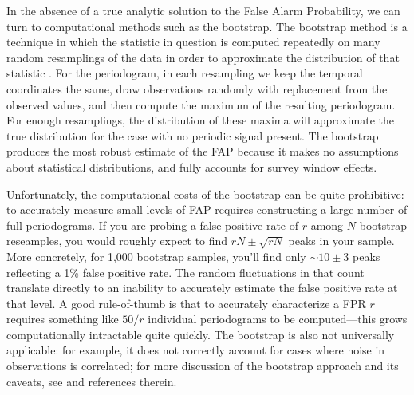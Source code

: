 \documentclass[preprint]{aastex}
\begin{document}
In the absence of a true analytic solution to the False Alarm Probability, we
can turn to computational methods such as the bootstrap.
The bootstrap method is a technique in which the statistic in question is
computed repeatedly on many random resamplings of the data in order to
approximate the distribution of that statistic
\citep[see][for a useful general discussion of this technique]{ICVG2014}.
For the periodogram, in each resampling we keep the temporal coordinates
the same, draw observations randomly with replacement from the observed
values, and then compute the maximum of the resulting periodogram.
For enough resamplings, the distribution of these maxima will approximate
the true distribution for the case with no periodic signal present.
The bootstrap produces the most robust estimate of the FAP because it makes
no assumptions about statistical distributions, and fully accounts for survey
window effects.

Unfortunately, the computational costs of the bootstrap can be quite
prohibitive: to accurately measure small levels of FAP requires constructing
a large number of full periodograms.
If you are probing a false positive rate of $r$ among $N$ bootstrap reseamples,
you would roughly expect to find $rN \pm \sqrt{rN}$ peaks in your sample.
More concretely, for 1,000 bootstrap samples, you'll find only $\sim 10\pm 3$
peaks reflecting a 1\% false positive rate.
The random fluctuations in that count translate directly to an inability to
accurately estimate the false positive rate at that level.
A good rule-of-thumb is that to accurately characterize a FPR $r$ requires
something like $50 / r$ individual periodograms to be computed---this grows
computationally intractable quite quickly.
The bootstrap is also not universally applicable: for example, it does not
correctly account for cases where noise in observations is correlated;
for more discussion of the bootstrap approach and its caveats, see
\citet{ICVG2014} and references therein.
\end{document}
